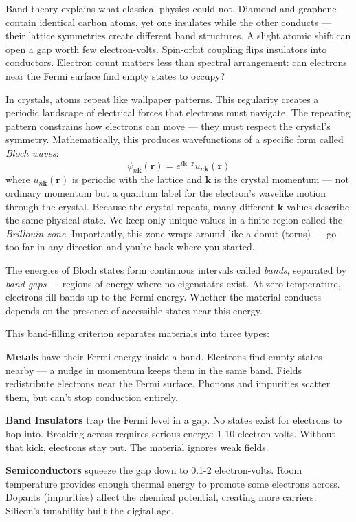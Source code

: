 Band theory explains what classical physics could not. Diamond and graphene contain identical carbon atoms, yet one insulates while the other conducts — their lattice symmetries create different band structures. A slight atomic shift can open a gap worth few electron-volts. Spin-orbit coupling flips insulators into conductors. Electron count matters less than spectral arrangement: can electrons near the Fermi surface find empty states to occupy?

In crystals, atoms repeat like wallpaper patterns. This regularity creates a periodic landscape of electrical forces that electrons must navigate. The repeating pattern constrains how electrons can move — they must respect the crystal's symmetry. Mathematically, this produces wavefunctions of a specific form called \emph{Bloch waves}:
\[
\psi_{n\mathbf{k}}(\mathbf{r}) = e^{i\mathbf{k} \cdot \mathbf{r}} u_{n\mathbf{k}}(\mathbf{r})
\]
where \( u_{n\mathbf{k}}(\mathbf{r}) \) is periodic with the lattice and \( \mathbf{k} \) is the crystal momentum — not ordinary momentum but a quantum label for the electron's wavelike motion through the crystal. Because the crystal repeats, many different \( \mathbf{k} \) values describe the same physical state. We keep only unique values in a finite region called the \emph{Brillouin zone}. Importantly, this zone wraps around like a donut (torus) — go too far in any direction and you're back where you started.

The energies of Bloch states form continuous intervals called \emph{bands}, separated by \emph{band gaps} — regions of energy where no eigenstates exist. At zero temperature, electrons fill bands up to the Fermi energy. Whether the material conducts depends on the presence of accessible states near this energy.

This band-filling criterion separates materials into three types:

\textbf{Metals} have their Fermi energy inside a band. Electrons find empty states nearby — a nudge in momentum keeps them in the same band. Fields redistribute electrons near the Fermi surface. Phonons and impurities scatter them, but can't stop conduction entirely.

\textbf{Band Insulators} trap the Fermi level in a gap. No states exist for electrons to hop into. Breaking across requires serious energy: 1-10 electron-volts. Without that kick, electrons stay put. The material ignores weak fields.

\textbf{Semiconductors} squeeze the gap down to 0.1-2 electron-volts. Room temperature provides enough thermal energy to promote some electrons across. Dopants (impurities) affect the chemical potential, creating more carriers. Silicon's tunability built the digital age.

